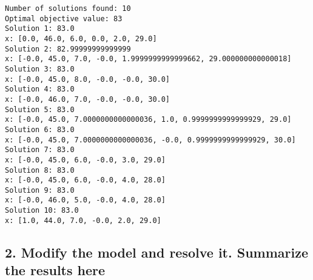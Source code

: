 \documentclass[11pt]{article}
\begin{document}
    \begin{Verbatim}[commandchars=\\\{\}]
Number of solutions found: 10
Optimal objective value: 83
Solution 1: 83.0
x: [0.0, 46.0, 6.0, 0.0, 2.0, 29.0]
Solution 2: 82.99999999999999
x: [-0.0, 45.0, 7.0, -0.0, 1.9999999999999662, 29.000000000000018]
Solution 3: 83.0
x: [-0.0, 45.0, 8.0, -0.0, -0.0, 30.0]
Solution 4: 83.0
x: [-0.0, 46.0, 7.0, -0.0, -0.0, 30.0]
Solution 5: 83.0
x: [-0.0, 45.0, 7.0000000000000036, 1.0, 0.9999999999999929, 29.0]
Solution 6: 83.0
x: [-0.0, 45.0, 7.0000000000000036, -0.0, 0.9999999999999929, 30.0]
Solution 7: 83.0
x: [-0.0, 45.0, 6.0, -0.0, 3.0, 29.0]
Solution 8: 83.0
x: [-0.0, 45.0, 6.0, -0.0, 4.0, 28.0]
Solution 9: 83.0
x: [-0.0, 46.0, 5.0, -0.0, 4.0, 28.0]
Solution 10: 83.0
x: [1.0, 44.0, 7.0, -0.0, 2.0, 29.0]
    \end{Verbatim}

    \hypertarget{modify-the-model-and-resolve-it.-summarize-the-results-here}{%
\subsection{2. Modify the model and resolve it. Summarize the results
here}\label{modify-the-model-and-resolve-it.-summarize-the-results-here}}
\end{document}

